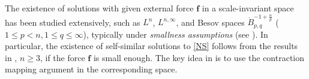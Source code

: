 \documentclass[12pt]{amsart}
\renewcommand{\div}{{\rm div \thinspace }}
\newcommand{\Bu}{{\boldsymbol{u}}}
\newcommand{\Bf}{{\boldsymbol{f}}}
\begin{document}
	
	
	
	
	
	
	The existence of solutions with given external force $\Bf$ in a scale-invariant space has been studied extensively, such as $L^{n}$, $L^{n,\infty}$, and Besov spaces $\Dot{B}_{p,q}^{-1+\frac{n}{p}}$ ($1\leq p<n, 1\leq q\leq \infty$), typically under \emph{smallness assumptions} (see \cite{Kozono95, Phan13, Kaneko19, Tsurumi19}). In particular, the     existence of self-similar solutions to \eqref{NS} follows from the results in \cite{Kozono95, Phan13}, $n\geq 3$, if the force $\Bf$ is small enough. 
	The key idea in \cite{Kozono95, Phan13} is to use the  contraction mapping argument in the corresponding space. %
	
	
	
\end{document}
